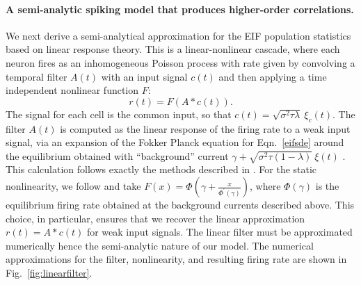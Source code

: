 \documentclass[%
 reprint,
 twocolumn,
 amsmath,amssymb,
 aps,
floatfix,
]{revtex4}
\begin{document}
\paragraph*{A semi-analytic spiking model that produces higher-order correlations.} We next derive a semi-analytical approximation for the EIF population statistics based on linear response theory. This is a linear-nonlinear cascade, where each neuron fires as an inhomogeneous Poisson process with rate given by convolving a temporal filter $A(t)$ with an input signal $c(t)$ and then applying a time independent nonlinear function \cite{Ostoijic} $F$:   
\begin{equation}
r(t) = F\left(A * c(t) \right). \nonumber
\end{equation}
The signal for each cell is the common input, so that $c(t) = \sqrt{\sigma^2 \tau \lambda}~\xi_c(t)$. The filter $A(t)$ is computed as the linear response of the firing rate to a weak input signal, via an expansion of the Fokker Planck equation for Eqn.~\eqref{eifsde} around the equilibrium obtained with ``background'' current $\gamma+ \sqrt{\sigma^2 \tau (1-\lambda)}~\xi(t)$ . This calculation follows exactly the methods described in \cite{Richardson}. For the static nonlinearity, we follow \cite{Ostojic:2011} and take $F(x) = \Phi\left( \gamma + \frac{x}{\Phi^\prime(\gamma)}\right)$, where $\Phi\left( \gamma \right)$ is the equilibrium firing rate obtained at the background currents described above.  This choice, in particular, ensures that we recover the linear approximation $r(t) = A * c(t)$ for weak input signals. The linear filter must be approximated numerically hence the semi-analytic nature of our model. The numerical approximations for the filter, nonlinearity, and resulting firing rate are shown in Fig.~\ref{fig:linearfilter}.
\end{document}
